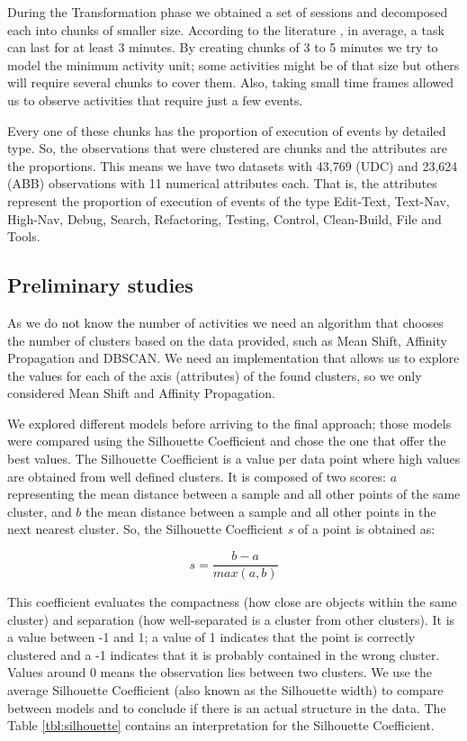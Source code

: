 \begin{changedforreviewerlong}

During the Transformation phase we obtained a set of sessions and decomposed each into chunks of smaller size. According to the literature \cite{GM04}, in average, a task can last for at least 3 minutes. By creating chunks of 3 to 5 minutes we try to model the minimum activity unit; some activities might be of that size but others will require several chunks to cover them. Also, taking small time frames allowed us to observe activities that require just a few events.

\end{changedforreviewerlong}

Every one of these chunks has the proportion of execution of events by detailed type. So, the observations that were clustered are chunks and the attributes are the proportions. This means we have two datasets with 43,769 (UDC) and 23,624 (ABB) observations with 11 numerical attributes each. That is, the attributes represent the proportion of execution of events of the type Edit-Text, Text-Nav, High-Nav, Debug, Search, Refactoring, Testing, Control, Clean-Build, File and Tools.

\subsection{Preliminary studies}
As we do not know the number of activities we need an algorithm that chooses the number of clusters based on the data provided, such as Mean Shift, Affinity Propagation and DBSCAN. We need an implementation that allows us to explore the values for each of the axis (attributes) of the found clusters, so we only considered Mean Shift and Affinity Propagation.

We explored different models before arriving to the final approach; those models were compared using the Silhouette Coefficient and chose the one that offer the best values. The Silhouette Coefficient \cite{R87} is a value per data point where high values are obtained from well defined clusters. It is composed of two scores: $a$ representing the mean distance between a sample and all other points of the same cluster, and $b$ the mean distance between a sample and all other points in the next nearest cluster. So, the Silhouette Coefficient $s$ of a point is obtained as:

$$s = \frac{b-a}{max(a,b)}$$

This coefficient evaluates the compactness (how close are objects within the same cluster) and separation (how well-separated is a cluster from other clusters). It is a value between -1 and 1; a value of 1 indicates that the point is correctly clustered and a -1 indicates that it is probably contained in the wrong cluster. Values around 0 means the observation lies between two clusters. We use the average Silhouette Coefficient (also known as the Silhouette width) to compare between models and to conclude if there is an actual structure in the data. The Table \ref{tbl:silhouette} contains an interpretation for the Silhouette Coefficient.

